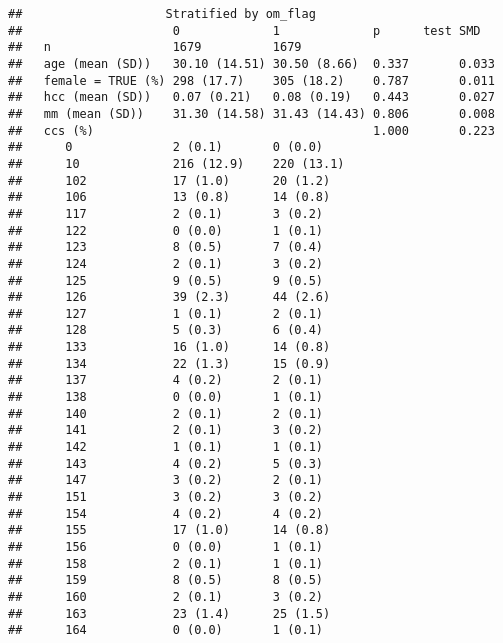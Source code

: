 \documentclass[]{article}
\begin{document}
\begin{verbatim}
##                    Stratified by om_flag
##                     0             1             p      test SMD  
##   n                 1679          1679                           
##   age (mean (SD))   30.10 (14.51) 30.50 (8.66)  0.337       0.033
##   female = TRUE (%) 298 (17.7)    305 (18.2)    0.787       0.011
##   hcc (mean (SD))   0.07 (0.21)   0.08 (0.19)   0.443       0.027
##   mm (mean (SD))    31.30 (14.58) 31.43 (14.43) 0.806       0.008
##   ccs (%)                                       1.000       0.223
##      0              2 (0.1)       0 (0.0)                        
##      10             216 (12.9)    220 (13.1)                     
##      102            17 (1.0)      20 (1.2)                       
##      106            13 (0.8)      14 (0.8)                       
##      117            2 (0.1)       3 (0.2)                        
##      122            0 (0.0)       1 (0.1)                        
##      123            8 (0.5)       7 (0.4)                        
##      124            2 (0.1)       3 (0.2)                        
##      125            9 (0.5)       9 (0.5)                        
##      126            39 (2.3)      44 (2.6)                       
##      127            1 (0.1)       2 (0.1)                        
##      128            5 (0.3)       6 (0.4)                        
##      133            16 (1.0)      14 (0.8)                       
##      134            22 (1.3)      15 (0.9)                       
##      137            4 (0.2)       2 (0.1)                        
##      138            0 (0.0)       1 (0.1)                        
##      140            2 (0.1)       2 (0.1)                        
##      141            2 (0.1)       3 (0.2)                        
##      142            1 (0.1)       1 (0.1)                        
##      143            4 (0.2)       5 (0.3)                        
##      147            3 (0.2)       2 (0.1)                        
##      151            3 (0.2)       3 (0.2)                        
##      154            4 (0.2)       4 (0.2)                        
##      155            17 (1.0)      14 (0.8)                       
##      156            0 (0.0)       1 (0.1)                        
##      158            2 (0.1)       1 (0.1)                        
##      159            8 (0.5)       8 (0.5)                        
##      160            2 (0.1)       3 (0.2)                        
##      163            23 (1.4)      25 (1.5)                       
##      164            0 (0.0)       1 (0.1)                        

\end{verbatim}
\end{document}
